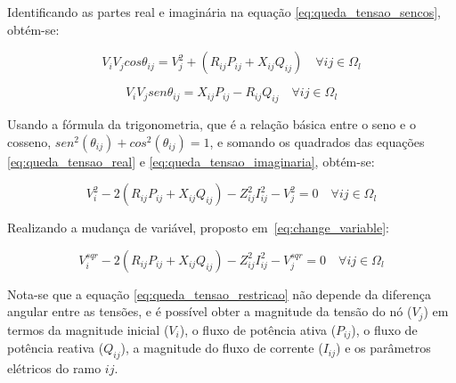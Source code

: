 Identificando as partes real e imaginária na equação \ref{eq:queda_tensao_sencos}, obtém-se:

\begin{equation}
    V_{i}V_{j}cos\theta_{ij} = V_{j}^{2} + (R_{ij}P_{ij} + X_{ij}Q_{ij})\quad\forall ij \in \Omega_{l}
    \label{eq:queda_tensao_real}
\end{equation}

\begin{equation}
    V_{i}V_{j}sen\theta_{ij} = X_{ij}P_{ij} - R_{ij}Q_{ij}\quad\forall ij \in \Omega_{l}
    \label{eq:queda_tensao_imaginaria}
\end{equation}

Usando a fórmula da trigonometria, que é a relação básica entre o seno e o cosseno, $sen^{2}(\theta_{ij}) + cos^{2}(\theta_{ij}) = 1$, e somando os quadrados das equações \ref{eq:queda_tensao_real} e \ref{eq:queda_tensao_imaginaria}, obtém-se:

\begin{equation}
    V_{i}^{2} - 2(R_{ij}P_{ij} + X_{ij}Q_{ij}) - Z_{ij}^{2}I_{ij}^{2} - V_{j}^{2} = 0\quad\forall ij \in \Omega_{l}
\end{equation}

Realizando a mudança de variável, proposto em~\ref{eq:change_variable}:

\begin{equation}\label{eq:queda_tensao_restricao}
    V_{i}^{sqr} - 2(R_{ij}P_{ij} + X_{ij}Q_{ij}) - Z_{ij}^{2}I_{ij}^{2} - V_{j}^{sqr} = 0\quad\forall ij \in \Omega_{l}
\end{equation}

Nota-se que a equação \ref{eq:queda_tensao_restricao} não depende da diferença angular entre as tensões, e é possível obter a magnitude da tensão do nó ($V_j$) em termos da magnitude inicial ($V_i$), o fluxo de potência ativa ($P_{ij}$), o fluxo de potência reativa ($Q_{ij}$), a magnitude do fluxo de corrente ($I_{ij}$) e os parâmetros elétricos do ramo $ij$.
